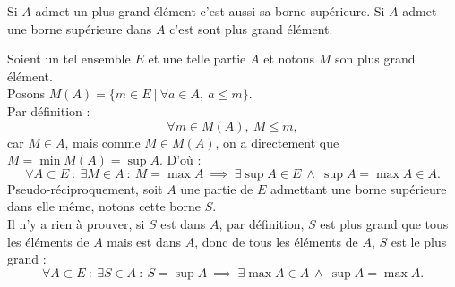 \documentclass{article}
\begin{document}
\maketitle

\begin{question_kholle}
	[\noindent Soit $(E, \leq)$ un ensemble ordonné, et $A$ une partie non-vide de $E$. \\
    S'il existe $M\in A$ tel que $M = \max{A}$ alors $\sup{A}$ existe et $\max{A} = \sup{A}.$ \\
    S'il existe $S\in A$ tel que $S = \sup{A}$ alors $\max{A}$ existe et $\max{A} = \sup{A}.$
    ]
	{Si $A$ admet un plus grand élément c'est aussi sa borne supérieure. Si $A$ admet une borne supérieure dans $A$ c'est sont plus grand élément.}

Soient un tel ensemble $E$ et une telle partie $A$ et notons $M$ son plus grand élément. \\
Posons $M(A) = \{ m\in E \ | \ \forall a \in A, \ a \leq m\}$. \\
Par définition : 
\[
\forall m \in M(A), \ M \leq m,
\]
car $M\in A$, mais comme $M\in M(A)$, on a directement que $M = \min{M(A)} = \sup{A}.$
D'où : 
\[
\forall A \subset E  \ : \ \exists M \in A \ : \ M = \max{A} \ \implies \ \exists \sup{A} \in E \ \wedge \ \sup{A} = \max{A} \in A.
\] 
Pseudo-réciproquement, soit $A$ une partie de $E$ admettant une borne supérieure dans elle même, notons cette borne $S$. \\
Il n'y a rien à prouver, si $S$ est dans $A$, par définition, $S$ est plus grand que tous les éléments de $A$ mais est dans $A$, donc de tous les éléments de $A$, $S$ est le plus grand : 
\[
\forall A \subset E \ : \ \exists S \in A \ : \ S = \sup{A} \ \implies \ \exists \max{A} \in A \ \wedge \ \sup{A} = \max{A}.
\]
\end{question_kholle}
\end{document}
